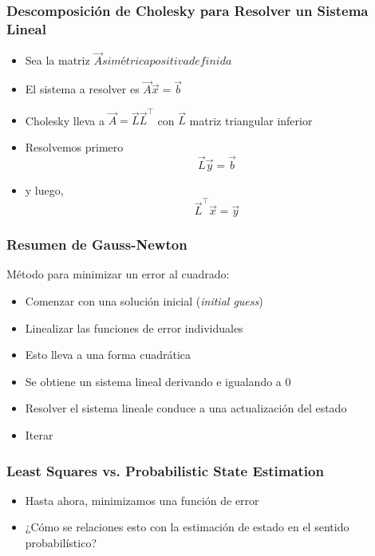 \begin{frame}
    \frametitle{Descomposición de Cholesky para Resolver un Sistema Lineal}
    
    \begin{itemize}
        \item Sea la matriz $\vec{A} simétrica positiva definida$
        \item El sistema a resolver es $\vec{A} \vec{x} = \vec{b}$
        \item Cholesky lleva a $\vec{A} = \vec{L} \vec{L}^{\top}$ con $\vec{L}$ matriz triangular inferior
        \item<2> Resolvemos primero
        \begin{equation*}
            \vec{L} \vec{y} = \vec{b}
        \end{equation*}
        \item<2> y luego,
        \begin{equation*}
            \vec{L}^{\top} \vec{x} = \vec{y}
        \end{equation*}
    
    \end{itemize}
    
\end{frame}

\begin{frame}
    \frametitle{Resumen de Gauss-Newton}
    
    Método para minimizar un error al cuadrado:
    \begin{itemize} 
        \item Comenzar con una solución inicial (\emph{initial guess})
        \item Linealizar las funciones de error individuales
        \item Esto lleva a una forma cuadrática
        \item Se obtiene un sistema lineal derivando e igualando a 0
        \item Resolver el sistema lineale conduce a una actualización del estado
        \item Iterar
    \end{itemize}
    
\end{frame}

\begin{frame}
    \frametitle{Least Squares vs. Probabilistic State Estimation}
    
    \begin{itemize}
        \item Hasta ahora, minimizamos una función de error
        \item ¿Cómo se relaciones esto con la estimación de estado en el sentido probabilístico?
    \end{itemize}
    
\end{frame}

